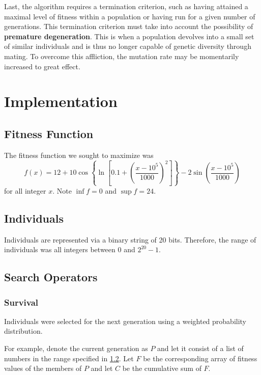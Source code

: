 \documentclass{article}
\begin{document}
  Last, the algorithm requires a termination criterion, such as having
  attained a maximal level of fitness within a population or having run for a
  given number of generations. This termination criterion must take into account
  the possibility of \textbf{premature degeneration}. This is when a population
  devolves into a small set of similar individuals and is thus no longer capable
  of genetic diversity through mating. To overcome this affliction, the mutation
  rate may be momentarily increased to great effect.

\section{Implementation}
  \subsection{Fitness Function}
    The fitness function we sought to maximize was
    $$
      f(x)= 12 +
      10\cos\left\{
        \ln\left[0.1 + \left(
          \frac{x-{10}^5}{1000}
        \right)^2
        \right]
      \right\}
      -2\sin\left(
        \frac{x-{10}^5}{1000}
      \right)
    $$
    for all integer $x$. Note $\inf{f}=0$ and $\sup{f}=24$.
    

  \subsection{Individuals}\label{individual-ranges}
    Individuals are represented via a binary string of 20 bits. Therefore, the
    range of individuals was all integers between $0$ and $2^{20}-1$.

  \subsection{Search Operators}
    \subsubsection{Survival}
      Individuals were selected for the next generation using a weighted
      probability distribution.

      For example, denote the current generation as $P$ and let it consist
      of a list of numbers in the range specified in \ref{individual-ranges}.
      Let $F$ be the corresponding array of fitness values of the members of
      $P$ and let $C$ be the cumulative sum of $F$.
      
\end{document}

